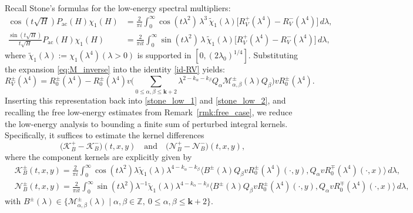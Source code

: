 \documentclass[reqno]{amsart}
\numberwithin{equation}{section}
\begin{document}
Recall Stone's formulas for the low-energy spectral multipliers:
\begin{align}
	\cos(t\sqrt{H})P_{\mathrm{ac}}(H)\chi_1(H)
	&= \frac{2}{\pi i} \int_0^{\infty} \cos(t\lambda^2)\,\lambda^{3}\,\widetilde{\chi}_1(\lambda)
	\bigl[R_V^{+}(\lambda^4)-R_V^{-}(\lambda^4)\bigr] \, d\lambda,   \label{stone_low_1} \\[4pt]
	\frac{\sin(t\sqrt{H})}{t\sqrt{H}}P_{\mathrm{ac}}(H)\chi_1(H)
	&= \frac{2}{\pi i t} \int_0^{\infty} \sin(t\lambda^2)\,\lambda\,\widetilde{\chi}_1(\lambda)
	\bigl[R_V^{+}(\lambda^4)-R_V^{-}(\lambda^4)\bigr] \, d\lambda, \label{stone_low_2}
\end{align}
where $\widetilde{\chi}_1(\lambda) := \chi_1(\lambda^4)(\lambda>0)$ is supported in $[0,(2\lambda_0)^{1/4}]$.
Substituting the expansion \eqref{eq:M_inverse} into the identity \eqref{id-RV} yields:
\begin{equation*}
	R_V^{\pm}(\lambda^4) = R_0^\pm(\lambda^{4}) - R_0^\pm(\lambda^{4})v \bigg( \sum_{0 \leq \alpha, \beta \leq \mathbf{k}+2} \lambda^{2-k_\alpha-k_\beta} Q_\alpha \mathcal{M}_{\alpha, \beta}^{\pm}(\lambda) Q_\beta \bigg) vR_0^\pm(\lambda^{4}).
\end{equation*}
Inserting this representation back into \eqref{stone_low_1} and \eqref{stone_low_2}, and recalling the free low-energy  estimates from Remark~\ref{rmk:free_case}, 
we reduce the low-energy analysis to bounding a finite sum of perturbed integral kernels.  Specifically, it suffices to estimate the kernel differences
\begin{equation*}
	\big(\mathcal{K}_{B}^+ - \mathcal{K}_{B}^-\big)(t,x,y) \quad \text{and} \quad \big(\mathcal{N}_{B}^+ - \mathcal{N}_{B}^-\big)(t,x,y) ,
\end{equation*}
where the component kernels are explicitly given by
\begin{align}
	\label{K_1}
	& \mathcal{K}_{B}^\pm(t,x,y)=\frac{2}{\pi i}\int_0^{\infty} \cos(t \lambda^2)\lambda \widetilde{\chi}_1(\lambda) \lambda^{4-k_\alpha-k_\beta}\bigl\langle  B^\pm(\lambda)Q_\beta vR_0^\pm(\lambda^{4})(\cdot,y), Q_\alpha vR_0^\mp(\lambda^{4})(\cdot,x)\bigr\rangle \, d \lambda, \\
	\label{Lambda_1}
	& \mathcal{N}_{B}^\pm(t,x,y)=\frac{2}{\pi it}\int_0^{\infty} \sin(t\lambda^2)\lambda^{-1}\widetilde{\chi}_1(\lambda)\lambda^{4-k_\alpha-k_\beta}
	\bigl\langle  B^\pm(\lambda)Q_\beta vR_0^\pm(\lambda^{4})(\cdot,y), Q_\alpha vR_0^\mp(\lambda^{4})(\cdot,x)\bigr\rangle \, d \lambda,
\end{align}
with $B^\pm(\lambda) \in \{ \mathcal{M}_{\alpha, \beta}^{\pm}(\lambda) \mid \alpha,\beta\in\mathbb{Z},\ 0 \le \alpha,\beta \le \mathbf{k}+2 \}.$
\end{document}
